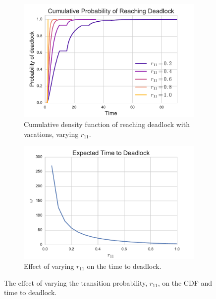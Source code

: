\documentclass{article}
\begin{document}
\begin{figure}[!hbtp]
\begin{center}
\begin{subfigure}[b]{0.45\textwidth}
    \includegraphics[width=\textwidth]{img/cdf_vary_r11.pdf}
    \caption{Cumulative density function of reaching deadlock with vacations, varying $r_{11}$.}
    \label{fig:cdf_varyr11}
\end{subfigure}
\begin{subfigure}[b]{0.45\textwidth}
    \includegraphics[width=\textwidth]{img/ttd_vary_r11.pdf}
    \caption{Effect of varying $r_{11}$ on the time to deadlock.}
    \label{fig:ttd_varyr11}
\end{subfigure}
\end{center}
\caption{The effect of varying the transition probability, $r_{11}$, on the CDF and time to deadlock.}
\label{fig:ttdcdf_varyr11}
\end{figure}



\end{document}
